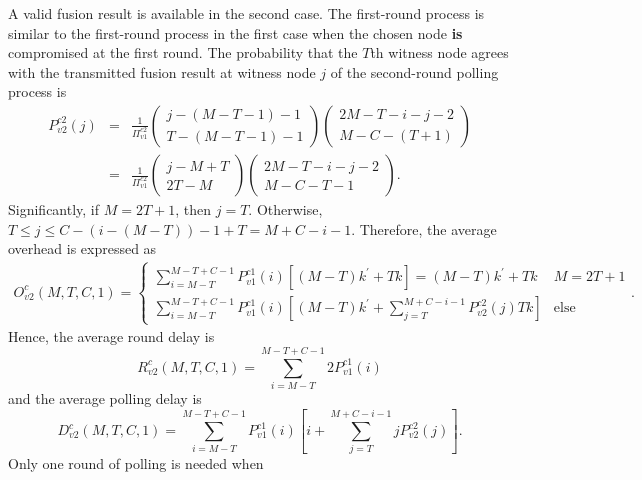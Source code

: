 \documentclass[12pt, onecolumn, draftcls]{IEEEtran}
\begin{document}
A valid fusion result is available in the second case. The
first-round process is similar to the first-round process in the
first case when the chosen node {\bf is} compromised at the first
round. The probability that the $T$th witness node agrees with the
transmitted fusion result at witness node $j$ of the second-round
polling process is
\begin{eqnarray*}
P_{v2}^{c2}(j)&=&\frac{1}{\Pi_{v1}^{c2}}\left(\begin{array}{c} j-(M-T-1)-1 \\
T-(M-T-1)-1
\end{array}\right) \left(\begin{array}{c}  2M-T-i-j-2 \\
M-C-(T+1)
\end{array}\right) \nonumber \\
&=&\frac{1}{\Pi_{v1}^{c2}}\left(\begin{array}{c} j-M+T \\ 2T-M
\end{array}\right) \left(\begin{array}{c}  2M-T-i-j-2 \\ M-C-T-1
\end{array}\right).
\end{eqnarray*}
Significantly, if $M=2T+1$, then $j=T$. Otherwise, $T \le j \le
C-(i-(M-T))-1+T=M+C-i-1$. Therefore, the average overhead is
expressed as
\begin{eqnarray}
O_{v2}^c(M,T,C,1) = \left\{ \begin{array}{ll} \sum_{i=M-T}^{M-T+C-1}
P_{v1}^{c1}(i) \left[(M-T)k^{\prime} + Tk \right]=(M-T)k^{\prime} + Tk& M=2T+1 \\
\sum_{i=M-T}^{M-T+C-1} P_{v1}^{c1}(i) \left[(M-T)k^{\prime} +
\sum_{j=T}^{M+C-i-1}P_{v2}^{c2}(j) Tk \right]& \mbox{else}
\end{array} \right..
 \label{eqn:polling_valid_compromised_overhead}
\end{eqnarray}
Hence, the average round delay is
\begin{equation}
R_{v2}^c(M,T,C,1) = \sum_{i=M-T}^{M-T+C-1} 2P_{v1}^{c1}(i)
\label{eqn:polling_valid_compromised_round_delay1}
\end{equation}
and the average polling delay is
\begin{equation}
D_{v2}^c(M,T,C,1) = \sum_{i=M-T}^{M-T+C-1}P_{v1}^{c1}(i)
\left[i+\sum_{j=T}^{M+C-i-1}jP_{v2}^{c2}(j) \right].
\label{eqn:polling_valid_compromised_polling_delay1}
\end{equation}
 Only one round of polling is needed when
\end{document}

